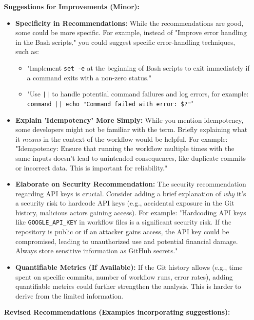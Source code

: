 \documentclass{article}
\begin{document}
\begin{itemize}
\begin{itemize}
\begin{itemize}
\textbf{Suggestions for Improvements (Minor):}

\begin{itemize}
      \item \textbf{Specificity in Recommendations:} While the recommendations are good, some could be more specific. For example, instead of "Improve error handling in the Bash scripts," you could suggest specific error-handling techniques, such as:
        \begin{itemize}
              \item "Implement \texttt{set -e} at the beginning of Bash scripts to exit immediately if a command exits with a non-zero status."
              \item "Use \texttt{||} to handle potential command failures and log errors, for example: \texttt{command || echo "Command failed with error: \$?"}"
       \end{itemize}
       \item \textbf{Explain 'Idempotency' More Simply:} While you mention idempotency, some developers might not be familiar with the term. Briefly explaining what it \textit{means} in the context of the workflow would be helpful. For example: "Idempotency: Ensure that running the workflow multiple times with the same inputs doesn't lead to unintended consequences, like duplicate commits or incorrect data. This is important for reliability."
       \item \textbf{Elaborate on Security Recommendation:} The security recommendation regarding API keys is crucial. Consider adding a brief explanation of \textit{why} it's a security risk to hardcode API keys (e.g., accidental exposure in the Git history, malicious actors gaining access). For example: "Hardcoding API keys like \texttt{GOOGLE\_API\_KEY} in workflow files is a significant security risk. If the repository is public or if an attacker gains access, the API key could be compromised, leading to unauthorized use and potential financial damage. Always store sensitive information as GitHub secrets."
       \item \textbf{Quantifiable Metrics (If Available):} If the Git history allows (e.g., time spent on specific commits, number of workflow runs, error rates), adding quantifiable metrics could further strengthen the analysis. This is harder to derive from the limited information.
 \end{itemize}

\textbf{Revised Recommendations (Examples incorporating suggestions):}


\end{itemize}
\end{itemize}
\end{itemize}
\end{document}
